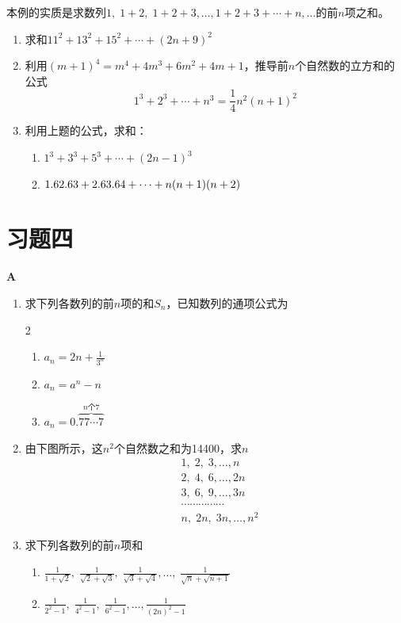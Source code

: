 \begin{rmk}
本例的实质是求数列$1,\; 1+2,\; 1+2+3,\ldots,1+2+3+\cdots +n,\ldots$的前$n$项之和。
\end{rmk}


\begin{ex}
\begin{enumerate}
    \item 求和$11^2+13^2+15^2+\cdots +(2n+9)^2$
    \item 利用$(m+1)^4=m^4+4m^3+6m^2+4m+1$，推导前$n$个自然数的立方和的公式
\[1^3+2^3+\cdots +n^3=\frac{1}{4}n^2(n+1)^2\]
\item 利用上题的公式，求和：
\begin{enumerate}[(1)]
    \item $1^3+3^3+5^3+\cdots +(2n-1)^3$
    \item $1.6 2.6 3+2.6 3.6 4+\cdots +n(n+1)(n+2)$
\end{enumerate}
\end{enumerate}
\end{ex}


\section*{习题四}
\begin{center}
    \bfseries A
\end{center}

\begin{enumerate}
    \item 求下列各数列的前$n$项的和$S_n$，已知数列的通项公式为
\begin{multicols}{2}
\begin{enumerate}[(1)]
    \item $a_n= 2n+\frac{1}{3^n}$
    \item $a_n= a^n-n$
    \item $a_n= 0.\overbrace{77\cdots 7}^{\text{$n$个7}}$
\end{enumerate}
\end{multicols}

\item 由下图所示，这$n^2$个自然数之和为14400，求$n$
\[\begin{split}
& 1,\; 2,\; 3,\ldots, n\\
&2,\; 4,\; 6,\ldots,2n\\
&3,\; 6,\; 9,\ldots,3n\\
&\cdots \cdots \cdots \cdots \cdots \\
&n,\; 2n,\; 3n,\ldots,n^2   
\end{split}\]

\item 求下列各数列的前$n$项和
\begin{enumerate}[(1)]
    \item $\frac{1}{1+\sqrt{2}},\; \frac{1}{\sqrt{2}+\sqrt{3}},\; \frac{1}{\sqrt{3}+\sqrt{4}},\ldots,\; \frac{1}{\sqrt{n}+\sqrt{n+1}}$
    \item $\frac{1}{2^2-1},\; \frac{1}{4^2-1},\; \frac{1}{6^2-1},\ldots, \frac{1}{(2n)^2-1}$
\end{enumerate}

\end{enumerate}

